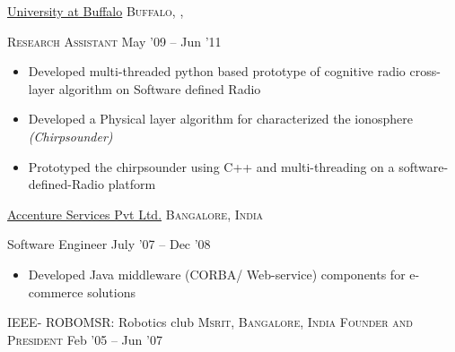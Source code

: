 \documentclass[10pt,a4paper]{article} %
\begin{document}
\headedsection %
{\href{http://www.ece.neu.edu/wineslab/}{University at Buffalo}}
{\textsc{Buffalo, , }} {

  \headedsubsection %
  {\textsc{Research Assistant}} {May '09 -- Jun '11}
  {\bodytext
	{
	  \begin{itemize}
		\item Developed multi-threaded python based prototype of cognitive radio cross-layer algorithm on Software defined Radio
		\item Developed a Physical layer algorithm for characterized the ionosphere \textit{(Chirpsounder)}
		\item Prototyped the chirpsounder using C++ and multi-threading on a software-defined-Radio platform
	  \end{itemize}
	}
  }
}


\headedsection %
{\href{http://www.accenture.com/}{Accenture Services Pvt Ltd.}}
{\textsc{Bangalore, India}} {

  \headedsubsection %
  {Software Engineer} {July '07 -- Dec '08}
  {
	\bodytext
	{
	  \begin{itemize}
		\item Developed Java middleware (CORBA/ Web-service) components for e-commerce solutions
	  \end{itemize}
	}
  }
}


\headedsection %
{IEEE- ROBOMSR: Robotics club} {\textsc{Msrit, Bangalore, India}}{
  \headedsubsection %
  {\textsc{Founder and President}} {Feb '05 -- Jun '07}
  {
  }
}
\end{document}

